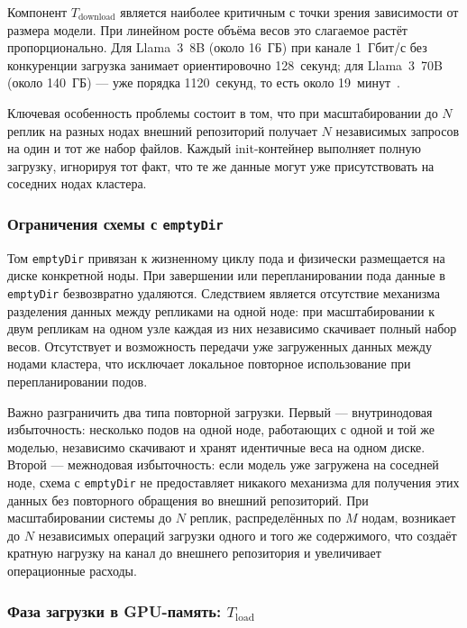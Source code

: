 Компонент $T_{\mathrm{download}}$ является наиболее критичным с точки зрения зависимости от размера модели. При линейном росте объёма весов это слагаемое растёт пропорционально. Для Llama~3~8B (около 16~ГБ) при канале 1~Гбит/с без конкуренции загрузка занимает ориентировочно 128~секунд; для Llama~3~70B (около 140~ГБ) --- уже порядка 1120~секунд, то есть около 19~минут~\cite{bentoml2024cold}.

Ключевая особенность проблемы состоит в том, что при масштабировании до $N$ реплик на разных нодах внешний репозиторий получает $N$ независимых запросов на один и тот же набор файлов. Каждый init-контейнер выполняет полную загрузку, игнорируя тот факт, что те же данные могут уже присутствовать на соседних нодах кластера.

\subsubsection{Ограничения схемы с \texttt{emptyDir}}

Том \texttt{emptyDir} привязан к жизненному циклу пода и физически размещается на диске конкретной ноды. При завершении или перепланировании пода данные в \texttt{emptyDir} безвозвратно удаляются. Следствием является отсутствие механизма разделения данных между репликами на одной ноде: при масштабировании к двум репликам на одном узле каждая из них независимо скачивает полный набор весов. Отсутствует и возможность передачи уже загруженных данных между нодами кластера, что исключает локальное повторное использование при перепланировании подов.

Важно разграничить два типа повторной загрузки. Первый --- внутринодовая избыточность: несколько подов на одной ноде, работающих с одной и той же моделью, независимо скачивают и хранят идентичные веса на одном диске. Второй --- межнодовая избыточность: если модель уже загружена на соседней ноде, схема с \texttt{emptyDir} не предоставляет никакого механизма для получения этих данных без повторного обращения во внешний репозиторий. При масштабировании системы до $N$ реплик, распределённых по $M$ нодам, возникает до $N$ независимых операций загрузки одного и того же содержимого, что создаёт кратную нагрузку на канал до внешнего репозитория и увеличивает операционные расходы.

\subsubsection{Фаза загрузки в GPU-память: $T_{\mathrm{load}}$}

